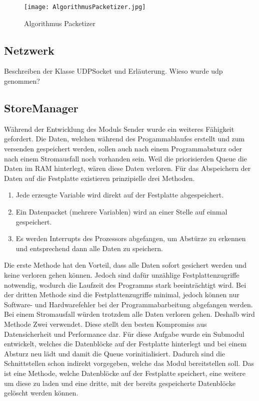 \begin{figure}[htb]
\centering
\texttt{[image: AlgorithmusPacketizer.jpg]}
\caption{Algorithmus Packetizer}
\label{fig:AlgorithmusPacketizer}
\end{figure}

\subsection{Netzwerk}

Beschreiben der Klasse UDPSocket und Erläuterung. Wieso wurde udp genommen?

\subsection{StoreManager}

Während der Entwicklung des Moduls Sender wurde ein weiteres Fähigkeit
gefordert.
Die Daten, welchen während des Progammablaufes erstellt und zum versenden
gespeichert werden, sollen auch nach einem Programmabsturz oder nach einem
Stromausfall noch vorhanden sein. Weil die priorisierden Queue die Daten im RAM
hinterlegt, wären diese Daten verloren.
Für das Abspeichern der Daten auf die Festplatte existieren prinzipielle drei Methoden.

\begin{enumerate}
\item Jede erzeugte Variable wird direkt auf der Festplatte abgespeichert.
\item Ein Datenpacket (mehrere Variablen) wird an einer Stelle auf
einmal gespeichert.
\item Es werden Interrupts des Prozessors abgefangen, um Abstürze zu erkennen
und entsprechend dann alle Daten zu speichern.
\end{enumerate}

Die erste Methode hat den Vorteil, dass alle Daten sofort gesichert werden und
keine verloren gehen können. Jedoch sind dafür unzählige Festplattenzugriffe
notwendig, wodurch die Laufzeit des Programms stark beeinträchtigt wird. Bei der
dritten Methode sind die Festplattenzugriffe minimal, jedoch können nur
Software- und Hardwarefehler bei der Programmabarbeitung abgefangen werden. Bei
einem Stromausfall würden trotzdem alle Daten verloren gehen. Deshalb wird
Methode Zwei verwendet. Diese stellt den besten Kompromiss aus Datensicherheit
und Performance dar. \newline
Für diese Aufgabe wurde ein Submodul entwickelt, welches die Datenblöcke auf
der Festplatte hinterlegt und bei einem Absturz neu lädt und damit die Queue
vorinitialisiert. Dadurch sind die Schnittstellen schon indirekt
vorgegeben, welche das Modul bereitstellen soll. Das ist eine Methode,
welche Datenblöcke auf der Festplatte speichert, eine weitere um diese zu laden
und eine dritte, mit der bereits gespeicherte Datenblöcke gelöscht werden können. 

